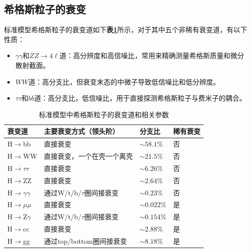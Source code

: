 \subsection{希格斯粒子的衰变}
标准模型希格斯粒子的衰变道如下\textbf{表\ref{table:2.2}}所示，对于其中五个非稀有衰变道，有以下性质：
\begin{itemize}
    \item $\gamma\gamma$和$ZZ\to4\ell$道：高分辨度和高信噪比，常用来精确测量希格斯质量和微分散射截面。
    \item $WW$道：高分支比，但衰变末态的中微子导致低信噪比和低分辨度。
    \item $\tau\tau$和$bb$道：高分支比，低信噪比，用于直接探测希格斯粒子与费米子的耦合。
\end{itemize}
\begin{table}[htbp]
    \caption{标准模型中希格斯粒子的衰变道和相关参数\cite{Higgs_cross_sections}}\label{table:2.2}
    \centering
    \begin{tabular}{>{\centering\arraybackslash}p{2cm}%
    >{\centering\arraybackslash}p{7cm}%
    >{\centering\arraybackslash}p{2cm}%
    >{\centering\arraybackslash}p{2cm}}
    \toprule\toprule
    \textbf{衰变道} & \textbf{主要衰变方式（领头阶）} & \textbf{分支比} & \textbf{稀有衰变}\\
    \midrule
    H$\to$bb & 直接衰变 & $\sim 58.1\%$ & 否\\
    H$\to$WW & 直接衰变，一个在壳一个离壳 & $\sim 21.5\%$ & 否\\
    H$\to\tau\tau$ & 直接衰变 & $\sim 6.26\%$ & 否\\
    H$\to$ZZ & 直接衰变 & $\sim2.64\%$ & 否\\
    H$\to\gamma\gamma$ & 通过W/t/b/$\tau$圈间接衰变 &  $\sim0.23\%$ & 否\\
    H$\to\mu\mu$ & 直接衰变 & $\sim 0.022\%$ & 是\\
    H$\to$Z$\gamma$ & 通过W/t/b/$\tau$圈间接衰变 & $\sim 0.154\%$ & 是\\
    H$\to$cc & 直接衰变 & $\sim2.88\%$ & 是\\
    H$\to$gg & 通过top/bottom圈间接衰变 & $\sim 8.18\%$ & 是\\
    \bottomrule\bottomrule
\end{tabular}
\end{table}

